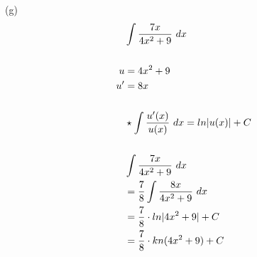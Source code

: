 \begin{exercise}
    (g)
    \begin{align}
           & \int {7x \over 4x^2 + 9} \ dx                     \\
        \\
        u  & = 4x^2 + 9                                        \\
        u' & = 8x                                              \\
        \\
           & \star \int {u'(x) \over u(x)} \ dx = ln|u(x)| + C \\
        \\
           & \int {7x \over 4x^2 + 9} \ dx                     \\
           & = {7 \over 8} \int {8x \over 4x^2 + 9} \ dx       \\
           & = {7 \over 8} \cdot ln|4x^2 + 9| + C              \\
           & = {7 \over 8} \cdot kn(4x^2 + 9) + C              \\
    \end{align}


\end{exercise}
